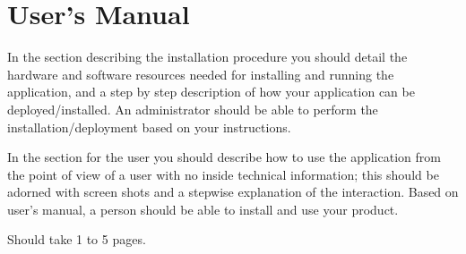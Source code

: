 \chapter{User’s Manual}
\pagestyle{fancy}

In the section describing the installation procedure you should detail the hardware and
software resources needed for installing and running the application, and a step by step
description of how your application can be deployed/installed. An administrator should be able
to perform the installation/deployment based on your instructions.


In the section for the user you should describe how to use the application from the point
of view of a user with no inside technical information; this should be adorned with screen shots
and a stepwise explanation of the interaction. Based on user's manual, a person should be able
to install and use your product.

{\noindent\color{blue}Should take 1 to 5 pages.\\}
